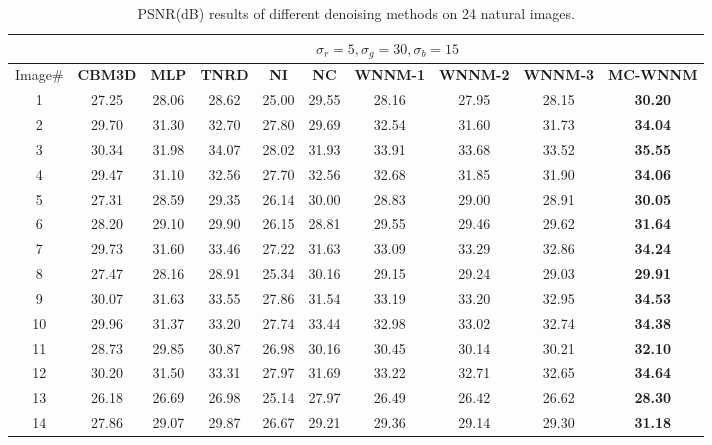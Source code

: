 \documentclass[10pt,onecolumn,letterpaper]{article}
\begin{document}
\begin{table}
\vspace{-1mm}
\caption{PSNR(dB) results of different denoising methods on 24 natural images.}
\label{t1}
\label{taba}
\begin{center}
\renewcommand\arraystretch{1.0}
\footnotesize
\begin{tabular}{|c||c|c|c|c|c|c|c|c|c|}
\hline
&\multicolumn{9}{c|}{ $\sigma_{r} = 5, \sigma_{g} = 30, \sigma_{b} = 15$}
\\
\hline
\hline
Image\#
&
\textbf{CBM3D}
&
\textbf{MLP}
&
\textbf{TNRD}
&
\textbf{NI}
&
\textbf{NC}
&
\textbf{WNNM-1}
&
\textbf{WNNM-2}
&
\textbf{WNNM-3}
&
\textbf{MC-WNNM}
\\
\hline
1 & 27.25 & 28.06 & 28.62 & 25.00 & 29.55 & 28.16 & 27.95 & 28.15 & \textbf{30.20}
\\
\hline
2 & 29.70 & 31.30 & 32.70 & 27.80 & 29.69 & 32.54 & 31.60 & 31.73 & \textbf{34.04}
\\
\hline
3 & 30.34 & 31.98 & 34.07 & 28.02 & 31.93 & 33.91 & 33.68 & 33.52 & \textbf{35.55}
\\
\hline 
4 & 29.47 & 31.10 & 32.56 & 27.70 & 32.56 & 32.68 & 31.85 & 31.90 & \textbf{34.06} 
\\
\hline
5 & 27.31 & 28.59 & 29.35 & 26.14 & 30.00 & 28.83 & 29.00 & 28.91 & \textbf{30.05}
\\
\hline
6 & 28.20 & 29.10 & 29.90 & 26.15 & 28.81 & 29.55 & 29.46 & 29.62 & \textbf{31.64}
\\
\hline
7 & 29.73 & 31.60 & 33.46 & 27.22 & 31.63 & 33.09 & 33.29 & 32.86 & \textbf{34.24} 
\\
\hline
8 & 27.47 & 28.16 & 28.91 & 25.34 & 30.16 & 29.15 & 29.24 & 29.03 & \textbf{29.91}
\\
\hline
9 & 30.07 & 31.63 & 33.55 & 27.86 & 31.54 & 33.19 & 33.20 & 32.95 & \textbf{34.53}
\\
\hline
10 & 29.96 & 31.37 & 33.20 & 27.74 & 33.44 & 32.98 & 33.02 & 32.74 & \textbf{34.38}
\\
\hline
11 & 28.73 & 29.85 & 30.87 & 26.98 & 30.16 & 30.45 & 30.14 & 30.21 & \textbf{32.10}
\\
\hline
12 & 30.20 & 31.50 & 33.31 & 27.97 & 31.69 & 33.22 & 32.71 & 32.65 & \textbf{34.64}
\\
\hline
13 & 26.18 & 26.69 & 26.98 & 25.14 & 27.97 & 26.49 & 26.42 & 26.62 & \textbf{28.30}
\\
\hline
14 & 27.86 & 29.07 & 29.87 & 26.67 & 29.21 & 29.36 & 29.14 & 29.30 & \textbf{31.18}
\\

\end{tabular}
\end{center}
\end{table}
\end{document}
